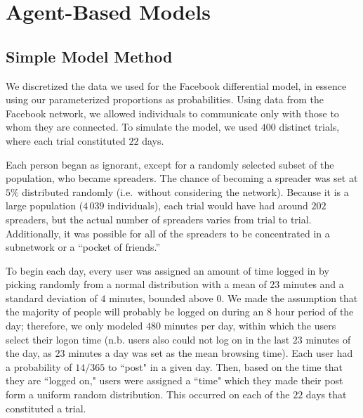 \section{Agent-Based Models }
\label{sec:abmodel}

\subsection{Simple Model Method}
\label{subsec:abmodelsetup}

\noindent We discretized the data we used for the Facebook differential model,
in essence using our parameterized proportions as probabilities. Using data from
the Facebook network, we allowed individuals to communicate only with those to
whom they are connected. To simulate the model, we used $ 400 $ distinct trials,
where each trial constituted $ 22 $ days.

Each person began as ignorant, except for a randomly selected subset of the
population, who became spreaders. The chance of becoming a spreader was set at $
5\% $ distributed randomly (i.e.\ without considering the network). Because it is
a large population ($ 4\,039 $ individuals), each trial would have had around $
202 $ spreaders, but the actual number of spreaders varies from trial to trial.
Additionally,  it was possible for all of the spreaders to be concentrated in a
subnetwork or a ``pocket of friends.''

To begin each day, every user was assigned an amount of time logged in by
picking randomly from a normal distribution with a mean of $ 23 $ minutes and a
standard deviation of $ 4 $ minutes, bounded above $ 0 $. We made the assumption
that the majority of people will probably be logged on during an $8$ hour period
of the day; therefore, we only modeled $480$ minutes per day, within which the
users select their logon time (n.b. users also could not log on in the last $ 23 $
minutes of the day, as $ 23 $ minutes a day was set as the mean browsing time).
Each user had a probability of $14/365$ to ``post" in a given day. Then, based
on the time that they are ``logged on," users were assigned a ``time" which they
made their post form a uniform random distribution. This occurred on each of the $
22 $ days that constituted a trial.

